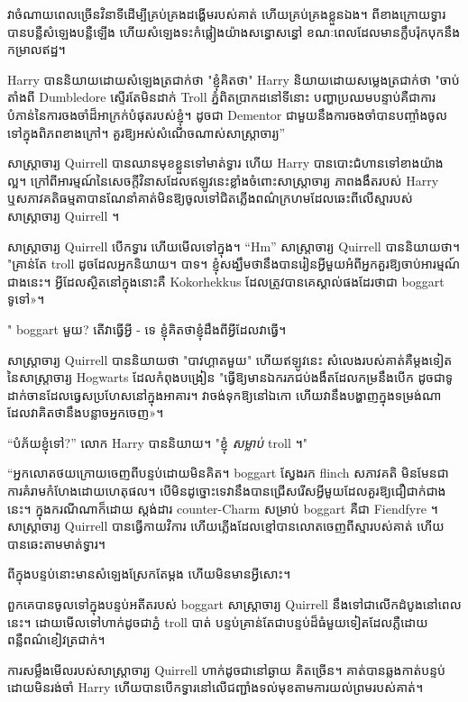 វាចំណាយពេលច្រើនវិនាទីដើម្បីគ្រប់គ្រងដង្ហើមរបស់គាត់ ហើយគ្រប់គ្រងខ្លួនឯង។ ពីខាងក្រោយទ្វារបានបន្លឺសំឡេងបន្លឺឡើង ហើយសំឡេងទះកំផ្លៀងយ៉ាងសន្ធោសន្ធៅ ខណៈពេលដែលមានក្លឹបរ៉ុកបុកនឹងកម្រាលឥដ្ឋ។

Harry បាននិយាយដោយសំឡេងត្រជាក់ថា "ខ្ញុំគិតថា" Harry និយាយដោយសម្លេងត្រជាក់ថា "ចាប់តាំងពី Dumbledore ស្ទើរតែមិនដាក់ Troll ភ្នំពិតប្រាកដនៅទីនោះ បញ្ហាប្រឈមបន្ទាប់គឺជាការបំភាន់នៃការចងចាំដ៏អាក្រក់បំផុតរបស់ខ្ញុំ។ ដូចជា Dementor ជាមួយនឹងការចងចាំបានបញ្ចាំងចូលទៅក្នុងពិភពខាងក្រៅ។ គួរឱ្យអស់សំណើចណាស់សាស្រ្តាចារ្យ”

សាស្ត្រាចារ្យ Quirrell បាន​ឈាន​មុខ​ខ្លួន​ទៅ​មាត់​ទ្វារ ហើយ Harry បាន​បោះ​ជំហាន​ទៅ​ខាង​យ៉ាង​ល្អ។ ក្រៅពីអារម្មណ៍នៃសេចក្តីវិនាសដែលឥឡូវនេះខ្លាំងចំពោះសាស្រ្តាចារ្យ ភាពងងឹតរបស់ Harry ឬសភាវគតិធម្មតាបានណែនាំគាត់មិនឱ្យចូលទៅជិតភ្លើងពណ៌ក្រហមដែលឆេះពីលើស្មារបស់សាស្រ្តាចារ្យ Quirrell ។

សាស្រ្តាចារ្យ Quirrell បើកទ្វារ ហើយមើលទៅក្នុង។ “Hm” សាស្ត្រាចារ្យ Quirrell បាននិយាយថា។ "គ្រាន់តែ troll ដូចដែលអ្នកនិយាយ។ បាទ។ ខ្ញុំ​សង្ឃឹម​ថា​នឹង​បាន​រៀន​អ្វី​មួយ​អំពី​អ្នក​គួរ​ឱ្យ​ចាប់​អារម្មណ៍​ជាង​នេះ​។ អ្វី​ដែល​ស្ថិត​នៅ​ក្នុង​នោះ​គឺ Kokorhekkus ដែល​ត្រូវ​បាន​គេ​ស្គាល់​ផង​ដែរ​ថា​ជា boggart ទូទៅ»។

" boggart មួយ? តើវាធ្វើអ្វី - ទេ ខ្ញុំគិតថាខ្ញុំដឹងពីអ្វីដែលវាធ្វើ។

សាស្ត្រាចារ្យ Quirrell បាននិយាយថា "បាវហ្គាតមួយ" ហើយឥឡូវនេះ សំលេងរបស់គាត់គឺម្តងទៀតនៃសាស្រ្តាចារ្យ Hogwarts ដែលកំពុងបង្រៀន "ធ្វើឱ្យមានឯករភជប់ងងឹតដែលកម្រនឹងបើក ដូចជាទូដាក់ចានដែលធ្វេសប្រហែសនៅក្នុងអាគារ។ វា​ចង់​ទុក​ឱ្យ​នៅ​ឯកោ ហើយ​វា​នឹង​បង្ហាញ​ក្នុង​ទម្រង់​ណា​ដែល​វា​គិត​ថា​នឹង​បន្លាច​អ្នក​ចេញ​»។

“បំភ័យខ្ញុំទៅ?” លោក Harry បាននិយាយ។ "ខ្ញុំ \emph{សម្លាប់} troll ។"

“អ្នកលោតថយក្រោយចេញពីបន្ទប់ដោយមិនគិត។ boggart ស្វែងរក flinch សភាវគតិ មិនមែនជាការគំរាមកំហែងដោយហេតុផល។ បើមិនដូច្នោះទេវានឹងបានជ្រើសរើសអ្វីមួយដែលគួរឱ្យជឿជាក់ជាងនេះ។ ក្នុងករណីណាក៏ដោយ ស្តង់ដារ counter-Charm សម្រាប់ boggart គឺជា Fiendfyre ។ សាស្ត្រាចារ្យ Quirrell បានធ្វើកាយវិការ ហើយភ្លើងដែលខ្មៅបានលោតចេញពីស្មារបស់គាត់ ហើយបានឆេះតាមមាត់ទ្វារ។

ពី​ក្នុង​បន្ទប់​នោះ​មាន​សំឡេង​ស្រែក​តែ​ម្តង ហើយ​មិន​មាន​អ្វី​សោះ។

ពួកគេបានចូលទៅក្នុងបន្ទប់អតីតរបស់ boggart សាស្ត្រាចារ្យ Quirrell នឹងទៅជាលើកដំបូងនៅពេលនេះ។ ដោយមើលទៅហាក់ដូចជាភ្នំ troll បាត់ បន្ទប់គ្រាន់តែជាបន្ទប់ដ៏ធំមួយទៀតដែលភ្លឺដោយពន្លឺពណ៌ខៀវត្រជាក់។

ការសម្លឹងមើលរបស់សាស្រ្តាចារ្យ Quirrell ហាក់ដូចជានៅឆ្ងាយ គិតច្រើន។ គាត់បានឆ្លងកាត់បន្ទប់ដោយមិនរង់ចាំ Harry ហើយបានបើកទ្វារនៅលើជញ្ជាំងទល់មុខតាមការយល់ព្រមរបស់គាត់។

